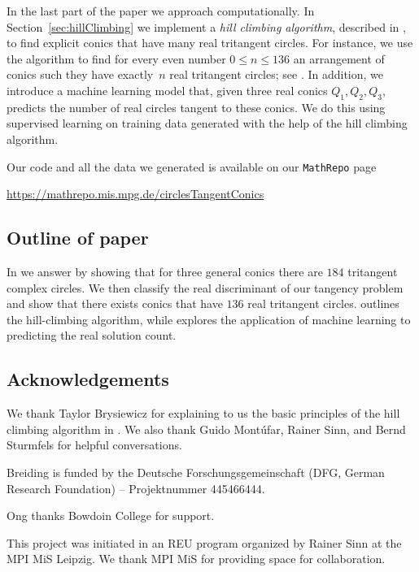 \documentclass[12pt]{amsart}
\theoremstyle{definition}
\theoremstyle{definition}
\numberwithin{equation}{section}
\begin{document}
In the last part of the paper we approach   computationally. In Section~\ref{sec:hillClimbing} we implement a \emph{hill climbing algorithm}, described in \cite{LinearProgram}, to find explicit conics that have many real tritangent circles. For instance, we use the algorithm to find for every even number $0\leq n\leq 136$ an arrangement of conics such they have exactly~$n$ real tritangent circles; see . In addition, we introduce a machine learning model that, given three real conics $Q_1, Q_2, Q_3$, predicts the number of real circles tangent to these conics. We do this using supervised learning on training data generated with the help of the hill climbing algorithm.

Our code and all the data we generated is available on our \texttt{MathRepo} page
\medskip

\begin{center}
\url{ https://mathrepo.mis.mpg.de/circlesTangentConics}
\end{center}
\medskip


\subsection{Outline of paper}  In  we answer  by showing that for three general conics there are $184$ tritangent complex circles. We then classify the real discriminant of our tangency problem and show that there exists conics that have $136$ real tritangent circles.  outlines the hill-climbing algorithm, while  explores the application of machine learning to predicting the real solution count. 


\subsection{Acknowledgements}
We thank Taylor Brysiewicz for explaining to us the basic principles of the hill climbing algorithm in . We also thank Guido Mont\'{u}far, Rainer Sinn, and Bernd Sturmfels for helpful conversations. 

Breiding is funded by the Deutsche Forschungsgemeinschaft (DFG, German Research Foundation) -- Projektnummer 445466444.

Ong thanks Bowdoin College for support. 

This project was initiated in an REU program organized by Rainer Sinn at the MPI MiS Leipzig. We thank MPI MiS for providing space for collaboration.
\end{document}
